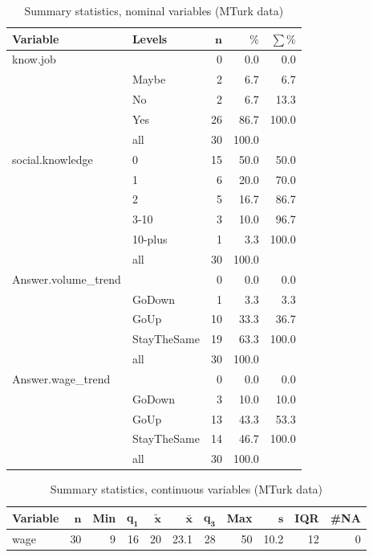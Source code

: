 \documentclass[a4paper,10pt]{article}\usepackage[]{graphicx}\usepackage[]{color}
\begin{document}
\begin{table}[ht]
\centering
{\footnotesize
\begin{tabular}{ll|rrr}
 \textbf{Variable} & \textbf{Levels} & $\mathbf{n}$ & $\mathbf{\%}$ & $\mathbf{\sum \%}$ \\ 
  \hline
know.job &  & 0 & 0.0 & 0.0 \\ 
   & Maybe & 2 & 6.7 & 6.7 \\ 
   & No & 2 & 6.7 & 13.3 \\ 
   & Yes & 26 & 86.7 & 100.0 \\ 
   \hline
 & all & 30 & 100.0 &  \\ 
   \hline
\hline
social.knowledge & 0 & 15 & 50.0 & 50.0 \\ 
   & 1 & 6 & 20.0 & 70.0 \\ 
   & 2 & 5 & 16.7 & 86.7 \\ 
   & 3-10 & 3 & 10.0 & 96.7 \\ 
   & 10-plus & 1 & 3.3 & 100.0 \\ 
   \hline
 & all & 30 & 100.0 &  \\ 
   \hline
\hline
Answer.volume\_trend &  & 0 & 0.0 & 0.0 \\ 
   & GoDown & 1 & 3.3 & 3.3 \\ 
   & GoUp & 10 & 33.3 & 36.7 \\ 
   & StayTheSame & 19 & 63.3 & 100.0 \\ 
   \hline
 & all & 30 & 100.0 &  \\ 
   \hline
\hline
Answer.wage\_trend &  & 0 & 0.0 & 0.0 \\ 
   & GoDown & 3 & 10.0 & 10.0 \\ 
   & GoUp & 13 & 43.3 & 53.3 \\ 
   & StayTheSame & 14 & 46.7 & 100.0 \\ 
   \hline
 & all & 30 & 100.0 &  \\ 
   \hline
\hline
\end{tabular}
}
\caption{Summary statistics, nominal variables (MTurk data)} 
\label{tab1:11-2020}
\end{table}
\begin{table}[ht]
\centering
{\footnotesize
\begin{tabular}{lrrrrrrrrrr}
 \textbf{Variable} & $\mathbf{n}$ & \textbf{Min} & $\mathbf{q_1}$ & $\mathbf{\widetilde{x}}$ & $\mathbf{\bar{x}}$ & $\mathbf{q_3}$ & \textbf{Max} & $\mathbf{s}$ & \textbf{IQR} & \textbf{\#NA} \\ 
  \hline
wage & 30 & 9 & 16 & 20 & 23.1 & 28 & 50 & 10.2 & 12 & 0 \\ 
  \end{tabular}
}
\caption{Summary statistics, continuous variables (MTurk data)} 
\label{tab2:11-2020}
\end{table}
\end{document}
